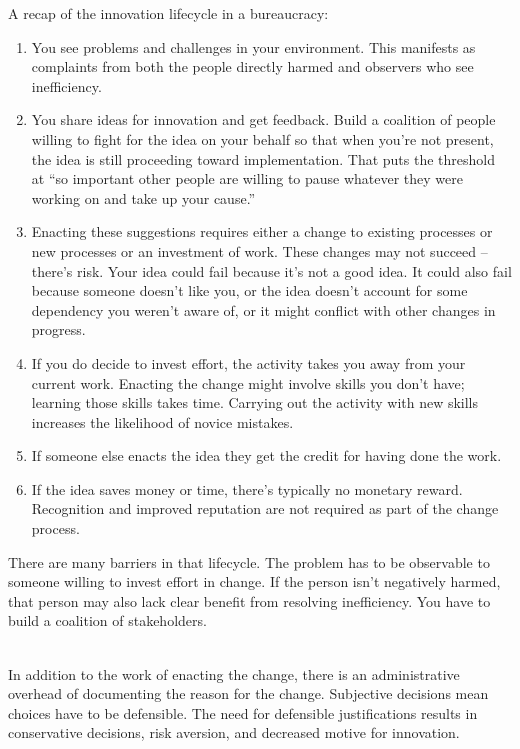 A recap of the innovation lifecycle in a bureaucracy:
\begin{enumerate}
    \item You see problems and challenges in your environment. This manifests as complaints from both the people directly harmed and observers who see inefficiency.
    \item You share ideas for innovation and get feedback. Build a coalition of people willing to fight for the idea on your behalf
%
%
    so that when you're not present, the idea is still proceeding toward implementation.  That puts the threshold at ``so important other people are willing to pause whatever they were working on and take up your cause.''
    \item Enacting these suggestions requires either a change to existing processes or new processes or an investment of work. These changes may not succeed -- there's risk. Your idea could fail because it's not a good idea. It could also fail because someone doesn't like you, or the idea doesn't account for some dependency you weren't aware of, or it might conflict with other changes in progress.
    \item If you do decide to invest effort, the activity takes you away from your current work. Enacting the change might involve skills you don't have; learning those skills takes time. Carrying out the activity with new skills increases the likelihood of novice mistakes.
    \item If someone else enacts the idea they get the credit for having done the work.
    \item If the idea saves money or time, there's typically no monetary reward. Recognition and improved reputation are not required as part of the change process. 
\end{enumerate}

There are many barriers in that lifecycle. The problem has to be observable to someone willing to invest effort in change. If the person isn't negatively harmed, that person may also lack clear benefit from resolving inefficiency. You have to build a coalition of stakeholders.  

\ \\

In addition to the work of enacting the change, there is an administrative overhead of documenting the reason for the change. 
Subjective decisions mean choices have to be defensible. 
The need for defensible justifications results in conservative decisions, risk aversion, and decreased motive for innovation. 

